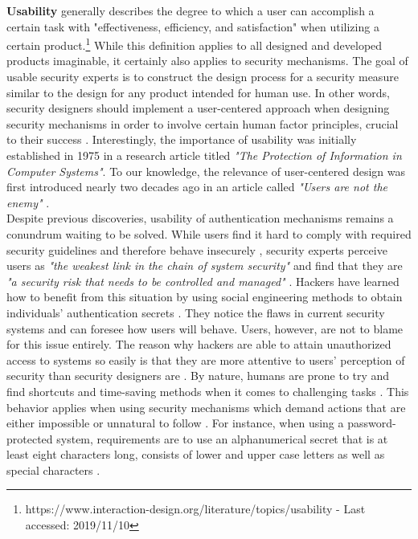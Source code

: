 \textbf{Usability} generally describes the degree to which a user can accomplish a certain task with "effectiveness, efficiency, and satisfaction" when utilizing a certain product.\footnote{https://www.interaction-design.org/literature/topics/usability - Last accessed: 2019/11/10} While this definition applies to all designed and developed products imaginable, it certainly also applies to security mechanisms. The goal of usable security experts is to construct the design process for a security measure similar to the design for any product intended for human use. In other words, security designers should implement a user-centered approach when designing security mechanisms in order to involve certain human factor principles, crucial to their success \cite{Adams:1999:UE:322796.322806, sasse}. Interestingly, the importance of usability was initially established in 1975 in a research article titled \textit{"The Protection of Information in Computer Systems"}. To our knowledge, the relevance of user-centered design was first introduced nearly two decades ago in an article called \textit{"Users are not the enemy"} \cite{Adams:1999:UE:322796.322806}. \\

Despite previous discoveries, usability of authentication mechanisms remains a conundrum waiting to be solved. While users find it hard to comply with required security guidelines and therefore behave insecurely \cite{Adams:1999:UE:322796.322806, sasse}, security experts perceive users as \textit{"the weakest link in the chain of system security"} \cite{sasse} and find that they are \textit{"a security risk that needs to be controlled and managed"}  \cite{Adams:1999:UE:322796.322806}. Hackers have learned how to benefit from this situation by using social engineering methods to obtain individuals' authentication secrets \cite{Adams:1999:UE:322796.322806, sasse}. They notice the flaws in current security systems and can foresee how users will behave. Users, however, are not to blame for this issue entirely. The reason why hackers are able to attain unauthorized access to systems so easily is that they are more attentive to users' perception of security than security designers are \cite{Adams:1999:UE:322796.322806}. By nature, humans are prone to try and find shortcuts and time-saving methods when it comes to challenging tasks \cite{sasse}. This behavior applies when using security mechanisms which demand actions that are either impossible or unnatural to follow \cite{sasse}. For instance, when using a password-protected system, requirements are to use an alphanumerical secret that is at least eight characters long, consists of lower and upper case letters as well as special characters \cite{payne, sasse}. \\


